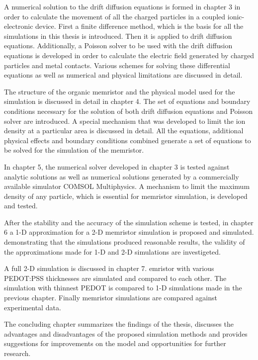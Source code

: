 \begin{doublespace}
A numerical solution to the drift diffusion equations is formed in chapter 3 in order to calculate the movement of all the charged particles in a coupled ionic-electronic device. First a finite difference method, which is the basis for all the simulations in this thesis is introduced. Then it is applied to  drift diffusion equations. Additionally, a Poisson solver to be used with the drift diffusion equations is developed in order to calculate the electric field generated by charged particles and metal contacts. Various schemes for solving these differential equations as well as numerical and physical limitations are discussed in detail.

The structure of the organic memristor and the physical model used for the simulation is discussed in detail in chapter 4. The set of equations and boundary conditions necessary for the solution of both  drift diffusion equations and  Poisson solver are introduced. A special mechanism that was developed to limit the ion density at a particular area is discussed in detail. All the equations, additional physical effects and boundary conditions combined generate a set of equations to be solved for the simulation of the memristor.
 
In chapter 5, the numerical solver developed in chapter 3 is tested against analytic solutions as well as numerical solutions generated by a commercially available simulator \tjs{(}COMSOL Multiphysics\tjs{)}\cite{Comsol}. A mechanism to limit the maximum density of any particle, which is essential for memristor simulation, is developed and tested. 

After the stability and the accuracy of the simulation scheme is tested, in chapter 6 a 1-D approximation for a 2-D memristor simulation is proposed and simulated.  demonstrating that the simulations produced reasonable results, the validity of the approximations made for 1-D and 2-D simulations are investigeted.  

A full 2-D simulation is discussed in chapter 7. emristor with various PEDOT:PSS thicknesses are simulated and compared to each other. The simulation with thinnest PEDOT is compared to 1-D simulations made in the previous chapter. Finally memristor simulations are compared against experimental data.

The concluding chapter summarizes the findings of the thesis, discusses the advantages and disadvantages of the proposed simulation methods and provides suggestions for improvements on the model and opportunities for further research.


\end{doublespace}
